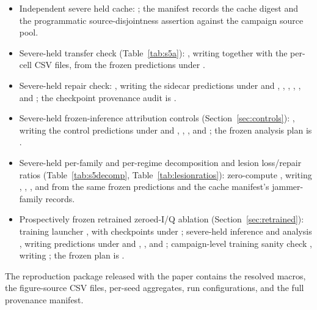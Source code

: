 \documentclass[letterpaper,onecolumn,11pt,journal]{IEEEtran}
\begin{document}
\begin{itemize}
   per split, and SHA-256 checksummed in the sealed cache
  manifest; it is never an input feature of any model.
  \item Independent severe held cache:
  ; the manifest records the cache
  digest and the programmatic \mbox{source-disjointness} assertion against the
  campaign source pool.
  \item Severe-held transfer check (Table~\ref{tab:s5a}):
  , writing
   together with
  the per-cell CSV files, from the frozen predictions under
  .
  \item Severe-held repair check:
  , writing the
  sidecar predictions under
   and
  , ,
  , ,
  , and ; the
  checkpoint provenance audit is .
  \item Severe-held frozen-inference attribution controls
  (Section~\ref{sec:controls}):
  , writing the
  control predictions under  and
  , ,
  , and
  ; the frozen analysis plan is
  .
  \item Severe-held per-family and per-regime decomposition and lesion
  loss/repair ratios (Table~\ref{tab:s5decomp},
  Table~\ref{tab:lesionratios}): zero-compute
  , writing
  ,
  , , and
   from the same frozen predictions and the
  cache manifest's jammer-family records.
  \item Prospectively frozen retrained zeroed-I/Q ablation
  (Section~\ref{sec:retrained}): training launcher
  ,
  with checkpoints under ;
  severe-held inference and analysis
  , writing
  predictions under  and
  , , and
  ; campaign-level training sanity check
  , writing
  ; the frozen plan is
  .
\end{itemize}

The reproduction package released with the paper contains the resolved macros,
the figure-source CSV files, per-seed aggregates, run configurations, and the
full provenance manifest.
\end{document}
